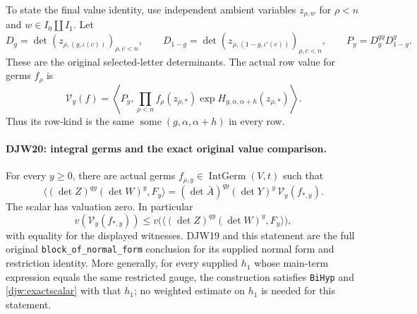 \documentclass[11pt,a4paper]{article}
\numberwithin{equation}{section}
\theoremstyle{remark}\newtheorem{remark}[theorem]{Remark}
\begin{document}
To state the final value identity, use independent ambient variables
$z_{\rho,w}$ for $\rho<n$ and $w\in I_0\amalg I_1$.
Let
\[
 D_g=\det(z_{\rho,(g,\iota(c))})_{\rho,c<n},\qquad
 D_{1-g}=\det(z_{\rho,(1-g,\iota'(c))})_{\rho,c<n},
 \qquad P_y=D_g^{qy}D_{1-g}^{y}.
\]
These are the original selected-letter determinants.  The actual
row value for germs $f_\rho$ is
\begin{equation}
 \mathcal V_y(f)=
 \left\langle P_y,
  \prod_{\rho<n}f_\rho(z_{\rho,*})
              \exp H_{g,\alpha,\alpha+h}(z_{\rho,*})\right\rangle.
 \label{djw:actualvalue}
\end{equation}
Thus its row-kind is the same
$\operatorname{some}(g,\alpha,\alpha+h)$ in every row.

\paragraph{DJW20: integral germs and the exact original value comparison.}
\label{claim:DJW20}
For every $y\ge0$, there are actual germs
$f_{\rho,y}\in\operatorname{IntGerm}(V,t)$ such that
\begin{equation}
 \langle(\det Z)^{qy}(\det W)^y,F_y\rangle
   = (\det\bar A)^{qy}(\det Y)^y\,
                     \mathcal V_y(f_{*,y}).
 \label{djw:exactscalar}
\end{equation}
The scalar has valuation zero.  In particular
\begin{equation}
 v(\mathcal V_y(f_{*,y}))
 \le v\bigl(\langle(\det Z)^{qy}(\det W)^y,F_y\rangle\bigr),
 \label{djw:actualcomparison}
\end{equation}
with equality for the displayed witnesses.  DJW19 and this statement
are the full original \texttt{block\_\allowbreak of\_\allowbreak normal\_\allowbreak form} conclusion
for its supplied normal form and restriction identity.
More generally, for every supplied $h_1$ whose main-term expression
equals the same restricted gauge, the construction satisfies
\texttt{Bi\allowbreak Hyp} and \eqref{djw:exactscalar} with that $h_1$;
no weighted estimate on $h_1$ is needed for this statement.
\end{document}
